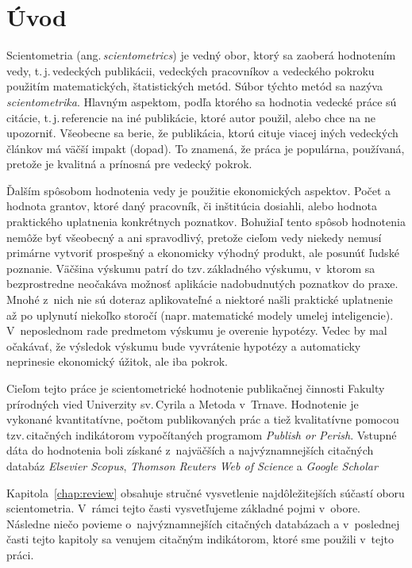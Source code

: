 \chapter*{Úvod}

Scientometria (ang.\,\emph{scientometrics}) je vedný obor, ktorý sa zaoberá
hodnotením vedy, t.\,j.\,vedeckých publikácii, vedeckých pracovníkov a vedeckého
pokroku použitím matematických, štatistických metód.  Súbor týchto metód sa
nazýva \emph{scientometrika}.  Hlavným aspektom, podľa ktorého sa hodnotia
vedecké práce sú citácie, t.\,j.\,referencie na iné publikácie, ktoré autor
použil, alebo chce na ne upozorniť.  Všeobecne sa berie, že publikácia, ktorú
cituje viacej iných vedeckých článkov má väčší impakt (dopad).  To znamená, že
práca je populárna, používaná, pretože je kvalitná a prínosná pre vedecký
pokrok.

Ďalším spôsobom hodnotenia vedy je použitie ekonomických aspektov.  Počet a
hodnota grantov, ktoré daný pracovník, či inštitúcia dosiahli, alebo hodnota
praktického uplatnenia konkrétnych poznatkov.  Bohužiaľ tento spôsob hodnotenia
nemôže byť všeobecný a ani spravodlivý, pretože cieľom vedy niekedy nemusí
primárne vytvoriť prospešný a ekonomicky výhodný produkt, ale posunúť ľudské
poznanie.  Väčšina výskumu patrí do tzv.\,základného výskumu, v~ktorom sa
bezprostredne neočakáva možnosť aplikácie nadobudnutých poznatkov do praxe.
Mnohé z~nich nie sú doteraz aplikovateľné a niektoré našli praktické uplatnenie
až po uplynutí niekoľko storočí (napr.\,matematické modely umelej inteligencie).
V~neposlednom rade predmetom výskumu je overenie hypotézy.  Vedec by mal
očakávať, že výsledok výskumu bude vyvrátenie hypotézy a automaticky neprinesie
ekonomický úžitok, ale iba pokrok.

Cieľom tejto práce je scientometrické hodnotenie publikačnej činnosti Fakulty
prírodných vied Univerzity sv.\,Cyrila a Metoda v~Trnave.  Hodnotenie je
vykonané kvantitatívne, počtom publikovaných prác a tiež kvalitatívne pomocou
tzv.\,citačných indikátorom vypočítaných programom \emph{Publish or Perish}.
Vstupné dáta do hodnotenia boli získané z~najväčších a najvýznamnejších
citačných databáz \emph{Elsevier Scopus}, \emph{Thomson Reuters Web of Science}
a \emph{Google Scholar}

Kapitola~\ref{chap:review} obsahuje stručné vysvetlenie najdôležitejších súčastí
oboru scientometria. V~rámci tejto časti vysvetľujeme základné pojmi v~obore.
Následne niečo povieme o~najvýznamnejších citačných databázach a v~poslednej
časti tejto kapitoly sa venujem citačným indikátorom, ktoré sme použili v~tejto
práci.

